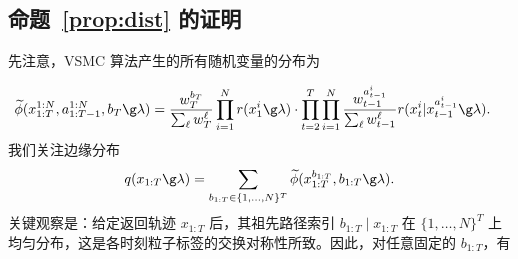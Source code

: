 \subsection{命题~\ref{prop:dist} 的证明}\label{sec:pf:dist}
先注意，VSMC 算法产生的所有随机变量的分布为

\begin{align}
&\widetilde\phi(x_{1:T}^{1:N},a_{1:T-1}^{1:N},b_T \g\lambda) = \frac{w_T^{b_T}}{\sum_{\ell}w_T^\ell} 
\prod_{i=1}^N r(x_1^i\g\lambda) \cdot \prod_{t=2}^T \prod_{i=1}^N
\frac{w_{t-1}^{a_{t-1}^i}}{\sum_\ell w_{t-1}^\ell} r(x_t^i | 
x_{t-1}^{a_{t-1}^i}\g\lambda).\label{eq:supp:vsmc-all}
\end{align}
我们关注边缘分布
\[
q(x_{1:T}\g\lambda)=\sum_{b_{1:T}\in\{1,\ldots,N\}^T}\widetilde\phi(x_{1:T}^{b_{1:T}},b_{1:T}\g\lambda).
\]
关键观察是：给定返回轨迹 $x_{1:T}$ 后，其祖先路径索引 $b_{1:T}\mid x_{1:T}$ 在 $\{1,\ldots,N\}^T$ 上均匀分布，这是各时刻粒子标签的交换对称性所致。因此，对任意固定的 $b_{1:T}$，有

